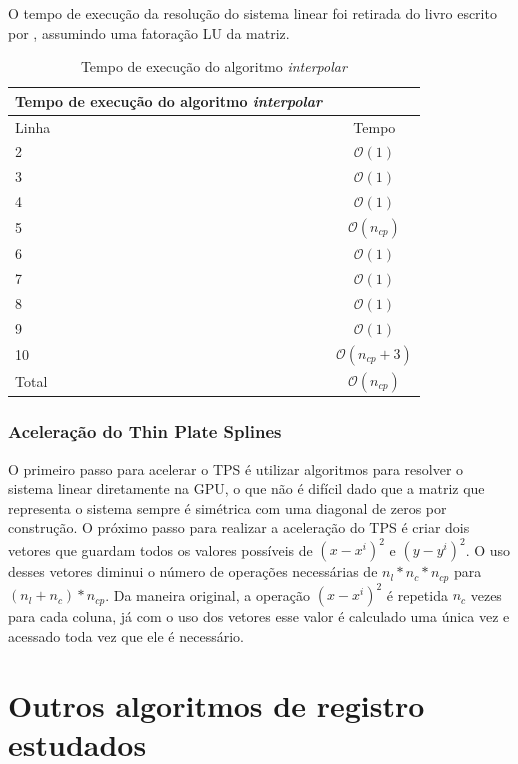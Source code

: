   O tempo de execução da resolução do sistema linear foi retirada do livro escrito por
\cite[Part~IV]{trefethen1997numerical}, assumindo uma fatoração LU da matriz.

\begin{table}[H]
\begin{center}
\begin{tabular}{l|c}
\hline
Tempo de execução do algoritmo \textit{interpolar} \\
\hline
Linha&Tempo\\
\hline
2       &$\mathcal{O}(1)$ \\
3       &$\mathcal{O}(1)$ \\
4       &$\mathcal{O}(1)$\\
5       &$\mathcal{O}(n_{cp})$\\
6       &$\mathcal{O}(1)$\\
7       &$\mathcal{O}(1)$\\
8       &$\mathcal{O}(1)$\\
9       &$\mathcal{O}(1)$\\
10      &$\mathcal{O}(n_{cp}+3)$\\
\hline
Total   &$\mathcal{O}(n_{cp})$\\
\hline
\end{tabular}
\caption{Tempo de execução do algoritmo \textit{interpolar}}
\label{table:interpolar}
\end{center}
\end{table}

\subsubsection{Aceleração do Thin Plate Splines}

    O primeiro passo para acelerar o TPS é utilizar algoritmos para resolver o sistema linear diretamente na GPU, o que
não é difícil dado que a matriz que representa o sistema sempre é simétrica com uma diagonal de zeros por construção. O
próximo passo para realizar a aceleração do TPS é criar dois vetores que guardam todos os valores possíveis de $(x-x^i)^2$
e $(y-y^i)^2$. O uso desses vetores diminui o número de operações necessárias de $n_l*n_c*n_{cp}$ para $(n_l+n_c)*n_{cp}$.
Da maneira original, a operação $(x-x^i)^2$ é repetida $n_c$ vezes para cada coluna, já com o uso dos vetores esse valor
é calculado uma única vez e acessado toda vez que ele é necessário.

\section{Outros algoritmos de registro estudados}

